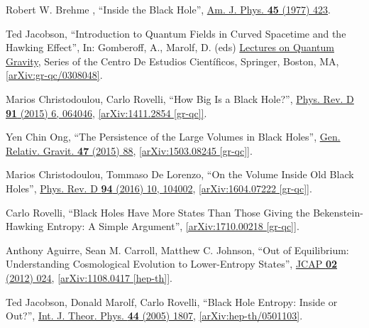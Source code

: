 \documentclass[12pt,preprintnumbers, floatfix, preprintnumbers, letterpaper, superscriptaddress,nofootinbib]{revtex4-2}
\begin{document}
\begin{thebibliography}{99}
Robert W. Brehme , ``Inside the Black Hole'', {\hypersetup{urlcolor=vividviolet}\href{https://pubs.aip.org/aapt/ajp/article-abstract/45/5/423/1050671/Inside-the-black-hole?redirectedFrom=fulltext}{Am. J. Phys. \textbf{45} (1977) 423}}.

Ted Jacobson, ``Introduction to Quantum Fields in Curved Spacetime and the Hawking Effect'', In: Gomberoff, A., Marolf, D. (eds) {\hypersetup{urlcolor=vividviolet}\href{https://doi.org/10.1007/0-387-24992-3_2}{Lectures on Quantum Gravity}}, Series of the Centro De Estudios Científicos, Springer, Boston, MA, \href{https://arxiv.org/abs/gr-qc/0308048}{[arXiv:gr-qc/0308048]}.

Marios Christodoulou, Carlo Rovelli, ``How Big Is a Black Hole?'', {\hypersetup{urlcolor=vividviolet}\href{https://journals.aps.org/prd/abstract/10.1103/PhysRevD.91.064046}{Phys. Rev. D \textbf{91} (2015) 6, 064046}}, \href{https://arxiv.org/abs/1411.2854}{[arXiv:1411.2854 [gr-qc]]}.


Yen Chin Ong, ``The Persistence of the Large Volumes in Black Holes'', {\hypersetup{urlcolor=vividviolet}\href{https://link.springer.com/article/10.1007/s10714-015-1929-x}{Gen. Relativ. Gravit. \textbf{47} (2015) 88}}, \href{https://arxiv.org/abs/1503.08245}{[arXiv:1503.08245 [gr-qc]]}.

Marios Christodoulou, Tommaso De Lorenzo, ``On the Volume Inside Old Black Holes'', {\hypersetup{urlcolor=vividviolet}\href{https://journals.aps.org/prd/abstract/10.1103/PhysRevD.94.104002}{Phys. Rev. D \textbf{94} (2016) 10, 104002}}, \href{https://arxiv.org/abs/1604.07222}{[arXiv:1604.07222 [gr-qc]]}.

Carlo Rovelli, ``Black Holes Have More States Than Those Giving the Bekenstein-Hawking Entropy: A Simple Argument'', \href{https://arxiv.org/abs/1710.00218}{[arXiv:1710.00218 [gr-qc]]}.


Anthony Aguirre, Sean M. Carroll, Matthew C. Johnson, ``Out of Equilibrium: Understanding Cosmological Evolution to Lower-Entropy States'', {\hypersetup{urlcolor=vividviolet}\href{https://iopscience.iop.org/article/10.1088/1475-7516/2012/02/024}{JCAP \textbf{02} (2012) 024}}, \href{https://arxiv.org/abs/1108.0417}{[arXiv:1108.0417 [hep-th]]}.


Ted Jacobson, Donald Marolf, Carlo Rovelli, ``Black Hole Entropy: Inside or Out?'', 	{\hypersetup{urlcolor=vividviolet}\href{https://link.springer.com/article/10.1007/s10773-005-8896-z}{Int. J. Theor. Phys. \textbf{44} (2005) 1807}}, \href{https://arxiv.org/abs/hep-th/0501103}{[arXiv:hep-th/0501103]}.


\end{thebibliography}
\end{document}

